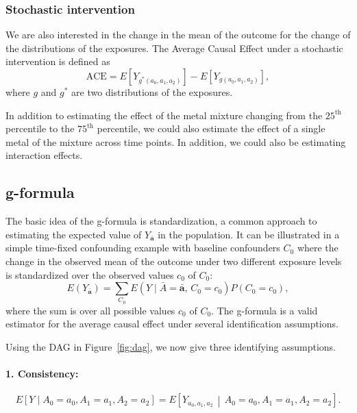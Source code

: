 \subsubsection*{Stochastic intervention}

We are also interested in the change in the mean of the outcome for the change of the distributions of the exposures. The Average Causal Effect under a stochastic intervention is defined as
\begin{equation*}
    \text{ACE} = E\!\left[Y_{g^*(a_0, a_1, a_2)}\right] - E\!\left[Y_{g(a_0, a_1, a_2)}\right],
\end{equation*}
where $g$ and $g^*$ are two distributions of the exposures.

In addition to estimating the effect of the metal mixture changing from the $25^{\text{th}}$ percentile to the $75^{\text{th}}$ percentile, we could also estimate the effect of a single metal of the mixture across time points. In addition, we could also be estimating interaction effects.

\subsection*{g-formula}

The basic idea of the g-formula is standardization, a common approach to estimating the expected value of $Y_{\bar{\mathbf{a}}}$ in the population.\cite{naimi_2017} It can be illustrated in a simple time-fixed confounding example with baseline confounders $C_0$ where the change in the observed mean of the outcome under two different exposure levels is standardized over the observed values $c_0$ of $C_0$:
\begin{equation*}
    E\!\left(Y_{\bar{\mathbf{a}}}\right) = \sum_{C_0} E\!\left(Y \mid \bar{A} = \bar{\mathbf{a}},\, C_0 = c_0\right) P(C_0 = c_0),
\end{equation*}
where the sum is over all possible values $c_0$ of $C_0$. The g-formula is a valid estimator for the average causal effect under several identification assumptions.

Using the DAG in Figure~\ref{fig:dag}, we now give three identifying assumptions.

\paragraph{1. Consistency:}
\begin{equation*}
    E[Y \mid A_0 = a_0, A_1 = a_1, A_2 = a_2] = E\!\left[Y_{a_0, a_1, a_2} \,\middle|\, A_0 = a_0, A_1 = a_1, A_2 = a_2\right].
\end{equation*}


